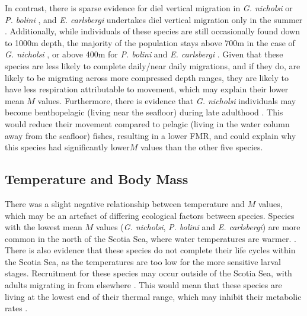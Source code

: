 \documentclass[12pt, titlepage]{article}
\begin{document}
In contrast, there is sparse evidence for diel vertical migration in \textit{G. nicholsi} or \textit{P. bolini} \citep{Saunders2015b, Collins2008},
and \textit{E. carlsbergi} undertakes diel vertical migration only in the summer \citep{Kozlov1991}.
Additionally, while individuals of these species are still occasionally found down to 1000m depth, the majority of the population stays above 700m in the case of \textit{G. nicholsi} \citep{Saunders2015a, Pusch2004, GonHeemstra}, %
 or above 400m for \textit{P. bolini} and \textit{E. carlsbergi} \citep{Saunders2014, Collins2012, Kozlov1991, Saunders2015b, Pusch2004}.
Given that these species are less likely to complete daily/near daily migrations, and if they do, are likely to be migrating across more compressed depth ranges, they are likely to have less respiration attributable to movement, which may explain their lower mean $M$ values.
Furthermore, there is evidence that \textit{G. nicholsi} individuals may become benthopelagic (living near the seafloor) during late adulthood \citep{Saunders2015a, GonHeemstra}.
This would reduce their movement compared to pelagic (living in the water column away from the seafloor) fishes, resulting in a lower FMR, and could explain why this species had significantly lower$M$ values than the other five species.

\subsection{Temperature and Body Mass}

There was a slight negative relationship between temperature and $M$ values, which may be an artefact of differing ecological factors between species.
Species with the lowest mean $M$ values (\textit{G. nicholsi}, \textit{P. bolini} and \textit{E. carlsbergi}) are more common in the north of the Scotia Sea, where water temperatures are warmer. \citep{Collins2012, Saunders2014, Piatkowski1994, GonHeemstra, Saunders2015b}. 
There is also evidence that these species do not complete their life cycles within the Scotia Sea, as the temperatures are too low for the more sensitive larval stages.
Recruitment for these species may occur outside of the Scotia Sea, with adults migrating in from elsewhere \citep{Saunders2015a, Saunders2014, Collins2012, Collins2008}.
This would mean that these species are living at the lowest end of their thermal range, which may inhibit their metabolic rates \citep{Clarke1999, Killen2010, Portner2008}.
\end{document}
